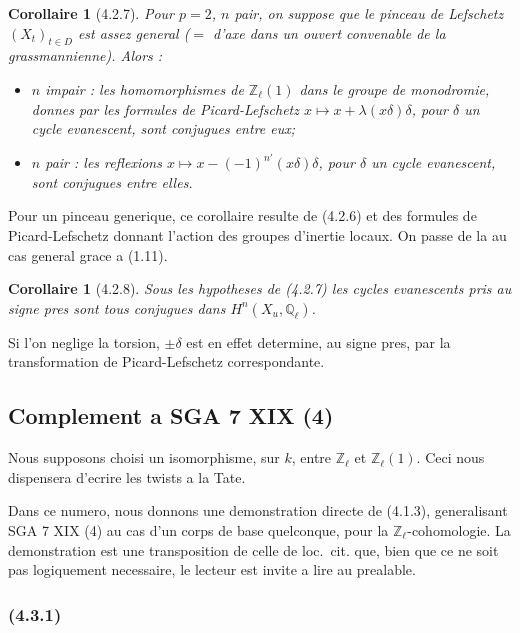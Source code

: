 \documentclass[12pt,a4paper]{article}
\theoremstyle{plain}
\newtheorem{corollary}[theorem]{Corollaire}
\theoremstyle{definition}
\theoremstyle{remark}
\newcommand{\Zl}{\mathbb{Z}_\ell}
\newcommand{\Ql}{\mathbb{Q}_\ell}
\begin{document}
\begin{corollary}[4.2.7]
Pour $p=2$, $n$ pair, on suppose que le pinceau de Lefschetz $(X_t)_{t \in D}$ est assez general ($=$ d'axe dans un ouvert convenable de la grassmannienne). Alors :
\begin{itemize}
\item[(i)] $n$ impair : les homomorphismes de $\Zl(1)$ dans le groupe de monodromie, donnes par les formules de Picard-Lefschetz $x \mapsto x + \lambda(x\delta)\delta$, pour $\delta$ un cycle evanescent, sont conjugues entre eux;
\item[(ii)] $n$ pair : les reflexions $x \mapsto x - (-1)^{n'}(x\delta)\delta$, pour $\delta$ un cycle evanescent, sont conjugues entre elles.
\end{itemize}
\end{corollary}

Pour un pinceau generique, ce corollaire resulte de (4.2.6) et des formules de Picard-Lefschetz donnant l'action des groupes d'inertie locaux. On passe de la au cas general grace a (1.11).

\begin{corollary}[4.2.8]
Sous les hypotheses de (4.2.7) les cycles evanescents pris au signe pres sont tous conjugues dans $H^n(X_u, \Ql)$.
\end{corollary}

Si l'on neglige la torsion, $\pm \delta$ est en effet determine, au signe pres, par la transformation de Picard-Lefschetz correspondante.

\subsection{Complement a SGA 7 XIX (4)}

Nous supposons choisi un isomorphisme, sur $k$, entre $\Zl$ et $\Zl(1)$. Ceci nous dispensera d'ecrire les twists a la Tate.

Dans ce numero, nous donnons une demonstration directe de (4.1.3), generalisant SGA 7 XIX (4) au cas d'un corps de base quelconque, pour la $\Zl$-cohomologie. La demonstration est une transposition de celle de loc.~cit. que, bien que ce ne soit pas logiquement necessaire, le lecteur est invite a lire au prealable.

\subsubsection*{\textup{(4.3.1)}}
\end{document}
